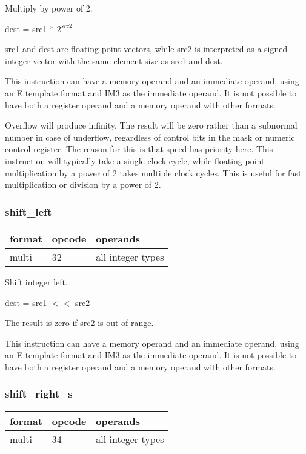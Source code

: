 \documentclass[forwardcom.tex]{subfiles}
\begin{document}
Multiply by power of 2.

dest = src1 * $2^{src2}$

src1 and dest are floating point vectors, while src2 is interpreted as a signed integer vector with the same element size as src1 and dest.
\vspace{2mm}

This instruction can have a memory operand and an immediate operand, using an E template format and IM3 as the immediate operand. It is not possible to have both a register operand and a memory operand with other formats.
\vspace{2mm}

Overflow will produce infinity. The result will be zero rather than a subnormal number in case of underflow, regardless of control bits in the mask or numeric control register. 
The reason for this is that
speed has priority here. This instruction will typically take a single clock cycle, while floating point multiplication by a power of 2 takes multiple clock cycles. 
This is useful for fast multiplication or division by a power of 2.


\subsubsection{shift\_left}
\label{table:shiftLeftInstruction}
\begin{tabular}{|p{12mm}|p{12mm}|p{110mm}|}
\hline
\bfseries format & \bfseries opcode & \bfseries operands \\ \hline
multi & 32 & all integer types \\ \hline
\end{tabular}
\vspace{2mm}

Shift integer left.

dest = src1 $<<$ src2
\vspace{2mm}

The result is zero if src2 is out of range.
\vspace{2mm}

This instruction can have a memory operand and an immediate operand, using an E template format and IM3 as the immediate operand. It is not possible to have both a register operand and a memory operand with other formats.
\vspace{2mm}

\subsubsection{shift\_right\_s}
\label{table:shiftRightSInstruction}
\begin{tabular}{|p{12mm}|p{12mm}|p{110mm}|}
\hline
\bfseries format & \bfseries opcode & \bfseries operands \\ \hline
multi & 34 & all integer types \\ \hline
\end{tabular}
\vspace{2mm}
\end{document}
